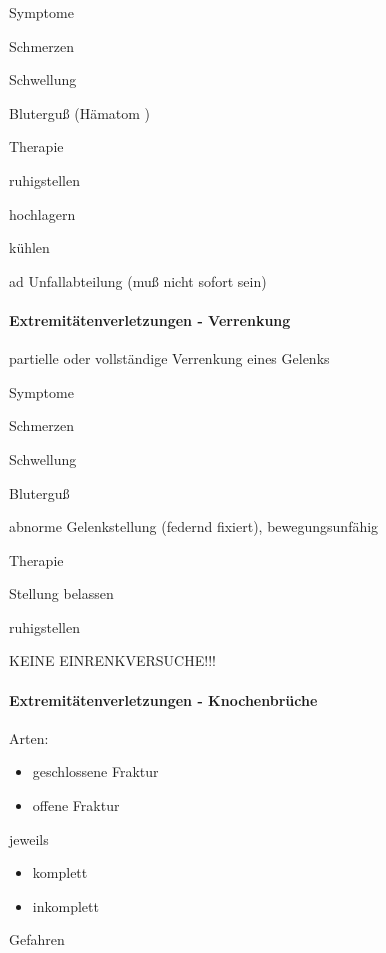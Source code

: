 \documentclass{article}
\begin{document}
{\mdseries\color{black}
Symptome}

{\mdseries
Schmerzen}

{\mdseries
Schwellung}

{\mdseries
Blutergu{\ss} (H\"amatom )}

{\mdseries\color{black}
Therapie}

{\mdseries
ruhigstellen}

{\mdseries
hochlagern}

{\mdseries
k\"uhlen}

{\mdseries
ad Unfallabteilung (mu{\ss} nicht sofort sein)}

\paragraph{Extremit\"atenverletzungen - Verrenkung}
{\mdseries
partielle oder vollst\"andige Verrenkung  eines Gelenks}

{\mdseries
Symptome}

{\mdseries
Schmerzen}

{\mdseries
Schwellung}

{\mdseries
Blutergu{\ss}}

{\mdseries
abnorme Gelenkstellung (federnd fixiert), bewegungsunf\"ahig}

{\mdseries\color{black}
Therapie}

{\mdseries
Stellung belassen}

{\mdseries
ruhigstellen}

{\mdseries
KEINE EINRENKVERSUCHE!!!}

\paragraph[Extremit\"atenverletzungen -
\ Knochenbr\"uche]{Extremit\"atenverletzungen -  Knochenbr\"uche}
{\mdseries\color{black}
Arten:}

\begin{itemize}
\item {\mdseries
geschlossene Fraktur}

\item {\mdseries
offene Fraktur}

\end{itemize}
{\mdseries
jeweils}

\begin{itemize}
\item {\mdseries
komplett}

\item {\mdseries
inkomplett}

\end{itemize}
{\mdseries\color{black}
Gefahren}
\end{document}
